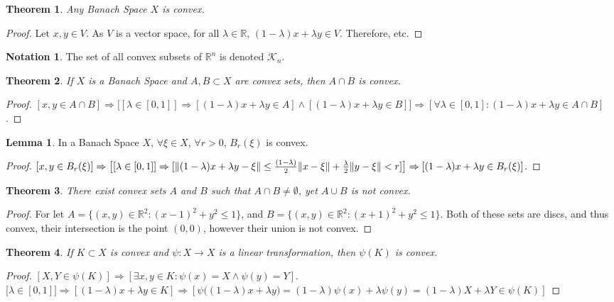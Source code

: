 \documentclass[oneside]{book}
\newtheorem{theorem}{Theorem}[section]
\theoremstyle{definition}
\newtheorem{lemma}{Lemma}[section]
\newtheorem{notation}{Notation}[section]
\begin{document}
\begin{theorem}
Any Banach Space $X$ is convex.
\end{theorem}
\begin{proof}
Let $x,y\in V$. As $V$ is a vector space, for all $\lambda \in \mathbb{R}$, $(1-\lambda)x+\lambda y\in V$. Therefore, etc.
\end{proof}

\begin{notation}
The set of all convex subsets of $\mathbb{R}^n$ is denoted $\mathscr{K}_n$.
\end{notation}

\begin{theorem}
If $X$ is a Banach Space and $A,B\subset X$ are convex sets, then $A\cap B$ is convex.
\end{theorem}
\begin{proof}
$[x,y \in A\cap B] \Rightarrow \big[[\lambda \in [0,1]]\Rightarrow[ (1-\lambda)x+\lambda y \in A]\land [ (1-\lambda)x+\lambda y \in B]\big] \Rightarrow [\forall \lambda \in [0,1]:(1-\lambda)x+\lambda y \in A\cap B]$. 
\end{proof}

\begin{lemma}
In a Banach Space $X$, $\forall \xi \in X$, $\forall r>0$, $B_{r}(\xi)$ is convex.
\end{lemma}
\begin{proof}
$[x,y\in B_{r}(\xi)]\Rightarrow\big[[\lambda \in [0,1]]\Rightarrow [\norm{(1-\lambda)x+\lambda y-\xi}\leq \frac{(1-\lambda)}{2}\norm{x-\xi}+\frac{\lambda}{2} \norm{y-\xi}< r]\big]\Rightarrow [(1-\lambda)x+\lambda y \in B_{r}(\xi)]$.
\end{proof}

\begin{theorem}
There exist convex sets $A$ and $B$ such that $A\cap B \ne \emptyset$, yet $A\cup B$ is not convex.
\end{theorem}
\begin{proof}
For let $A = \{(x,y)\in \mathbb{R}^2: (x-1)^2+y^2\leq 1\}$, and $B = \{(x,y)\in \mathbb{R}^2:(x+1)^2+y^2\leq 1\}$. Both of these sets are discs, and thus convex, their intersection is the point $(0,0)$, however their union is not convex.
\end{proof}

\begin{theorem}
If $K\subset X$ is convex and $\psi:X\rightarrow X$ is a linear transformation, then $\psi(K)$ is convex.
\end{theorem}
\begin{proof}
$[X,Y\in \psi(K)]\Rightarrow [\exists x,y\in K:\psi(x)=X\land \psi(y)=Y]$. $\big[\lambda \in [0,1]\big]\Rightarrow [(1-\lambda)x+\lambda y\in K]\Rightarrow [\psi\big((1-\lambda)x+\lambda y\big)=(1-\lambda)\psi(x)+\lambda\psi(y) = (1-\lambda)X+\lambda Y \in \psi(K)]$
\end{proof}
\end{document}
